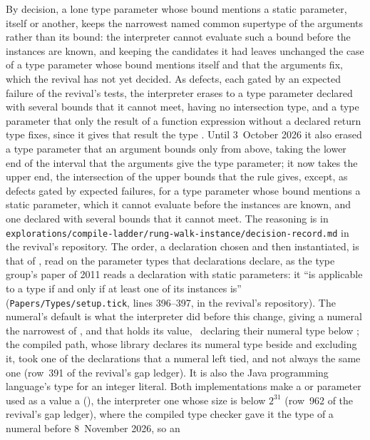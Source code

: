 \begin{description}
By decision, a lone type parameter whose bound mentions a static parameter,
itself or another, keeps the narrowest named common supertype of the arguments
rather than its bound: the interpreter cannot evaluate such a bound before the
instances are known, and keeping the candidates it had leaves unchanged the
case of a type parameter whose bound mentions itself and that the arguments
fix, which the revival has not yet decided.
As defects, each gated by an expected failure of the revival's tests, the
interpreter erases to  a type parameter declared with several
bounds that it cannot meet, having no intersection type, and a type parameter
that only the result of a function expression without a declared return type
fixes, since it gives that result the type .
Until 3~October 2026 it also erased a type parameter that an argument bounds
only from above, taking the lower end of the interval that the arguments give
the type parameter; it now takes the upper end, the intersection of the upper
bounds that the rule gives, except, as defects gated by expected failures, for
a type parameter whose bound mentions a static parameter, which it cannot
evaluate before the instances are known, and one declared with several bounds
that it cannot meet.
The reasoning is in
\nolinkurl{explorations/compile-ladder/rung-walk-instance/decision-record.md}
in the revival's repository.
The order, a declaration chosen and then instantiated, is that of
, read on the parameter types that declarations
declare, as the type group's paper of 2011 reads a declaration with static
parameters: it ``is applicable to a type if and only if at least one of its
instances is'' (\nolinkurl{Papers/Types/setup.tick}, lines 396--397, in the
revival's repository).
The numeral's default is what the interpreter did before this change, giving
a numeral the narrowest of ,  and
 that holds its value, \library\ declaring their numeral type
below ; the compiled path, whose library declares its
numeral type beside  and excluding it, took one of the
declarations that a numeral left tied, and not always the same one (row~391 of
the revival's gap ledger).
It is also the Java programming language's type for an integer literal.
Both implementations make a  or  parameter used as a value a
 (), the interpreter one whose size
is below $2^{31}$ (row~962 of the revival's gap ledger), where the compiled type
checker gave it the type of a numeral before 8~November 2026, so an 

\end{description}
